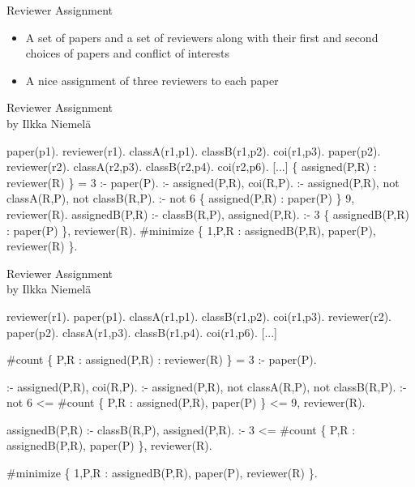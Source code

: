 \begin{frame}{Reviewer Assignment}

  \bigskip

  \begin{itemize}
  \item<1-> 
    A set of papers and a set of reviewers along with their first and second choices of papers and conflict of interests
    \medskip
  \item<1-> 
    A \alert<2>{nice} assignment of three reviewers to each paper
  \end{itemize}

\end{frame}
\begin{frame}[fragile,shrink=1]{Reviewer Assignment\\[-8pt]\footnotesize by Ilkka Niemelä}
\begin{semiverbatim}
paper(p1).  reviewer(r1). classA(r1,p1). classB(r1,p2). coi(r1,p3).
paper(p2).  reviewer(r2). classA(r2,p3). classB(r2,p4). coi(r2,p6).
[...]
\pause
\{ assigned(P,R) : reviewer(R) \} = 3 :-  paper(P).
\pause
 :- assigned(P,R), coi(R,P).
 :- assigned(P,R), not classA(R,P), not classB(R,P).
 :- not 6 \{ assigned(P,R) : paper(P) \} 9, reviewer(R).
\pause
assignedB(P,R) :-  classB(R,P), assigned(P,R).
 :- 3 \{ assignedB(P,R) : paper(P) \}, reviewer(R).
\pause
#minimize \{ 1,P,R : assignedB(P,R), paper(P), reviewer(R) \}.


\end{semiverbatim}
\end{frame}
\begin{frame}[fragile,shrink=1]{Reviewer Assignment\\[-8pt]\footnotesize by Ilkka Niemelä}
\begin{semiverbatim}
reviewer(r1). paper(p1). classA(r1,p1). classB(r1,p2). coi(r1,p3).
reviewer(r2). paper(p2). classA(r1,p3). classB(r1,p4). coi(r1,p6).
[...]

\alert<2>{#count} \{ \alert<2>{P,R :} assigned(P,R) \alert<2>{:} reviewer(R) \} = 3 :-  paper(P).

 :- assigned(P,R), coi(R,P).
 :- assigned(P,R), not classA(R,P), not classB(R,P).
 :- not 6 \alert<2>{<= #count} \{ \alert<2>{P,R :} assigned(P,R)\alert<2>{,} paper(P) \} \alert<2>{<= 9}, reviewer(R).

assignedB(P,R) :-  classB(R,P), assigned(P,R).
 :- 3 \alert<2>{<= #count} \{ \alert<2>{P,R :} assignedB(P,R), paper(P) \}, reviewer(R).

#minimize \{ 1,P,R : assignedB(P,R), paper(P), reviewer(R) \}.


\end{semiverbatim}
\end{frame}
%
